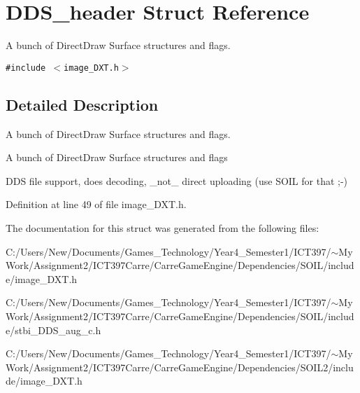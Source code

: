 \hypertarget{struct_d_d_s__header}{
\section{DDS\_\-header Struct Reference}
\label{struct_d_d_s__header}
}
A bunch of DirectDraw Surface structures and flags.  


{\tt \#include $<$image\_\-DXT.h$>$}



\subsection{Detailed Description}
A bunch of DirectDraw Surface structures and flags. 

A bunch of DirectDraw Surface structures and flags

DDS file support, does decoding, \_\-not\_\- direct uploading (use SOIL for that ;-) 

Definition at line 49 of file image\_\-DXT.h.

The documentation for this struct was generated from the following files:\begin{CompactItemize}
\item 
C:/Users/New/Documents/Games\_\-Technology/Year4\_\-Semester1/ICT397/$\sim$My Work/Assignment2/ICT397Carre/CarreGameEngine/Dependencies/SOIL/include/image\_\-DXT.h\item 
C:/Users/New/Documents/Games\_\-Technology/Year4\_\-Semester1/ICT397/$\sim$My Work/Assignment2/ICT397Carre/CarreGameEngine/Dependencies/SOIL/include/stbi\_\-DDS\_\-aug\_\-c.h\item 
C:/Users/New/Documents/Games\_\-Technology/Year4\_\-Semester1/ICT397/$\sim$My Work/Assignment2/ICT397Carre/CarreGameEngine/Dependencies/SOIL2/include/image\_\-DXT.h\end{CompactItemize}
